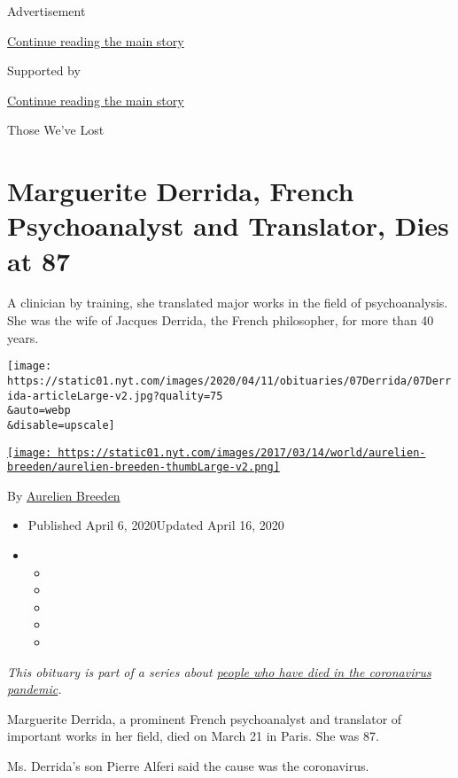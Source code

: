 Advertisement

\protect\hyperlink{after-top}{Continue reading the main story}

Supported by

\protect\hyperlink{after-sponsor}{Continue reading the main story}

Those We've Lost

\hypertarget{marguerite-derrida-french-psychoanalyst-and-translator-dies-at-87}{%
\section{Marguerite Derrida, French Psychoanalyst and Translator, Dies
at
87}\label{marguerite-derrida-french-psychoanalyst-and-translator-dies-at-87}}

A clinician by training, she translated major works in the field of
psychoanalysis. She was the wife of Jacques Derrida, the French
philosopher, for more than 40 years.

\texttt{[image: https://static01.nyt.com/images/2020/04/11/obituaries/07Derrida/07Derrida-articleLarge-v2.jpg?quality=75\\\&auto=webp\\\&disable=upscale]}

\href{https://www.nytimes.com/by/aurelien-breeden}{\texttt{[image: https://static01.nyt.com/images/2017/03/14/world/aurelien-breeden/aurelien-breeden-thumbLarge-v2.png]}}

By \href{https://www.nytimes.com/by/aurelien-breeden}{Aurelien Breeden}

\begin{itemize}
\item
  Published April 6, 2020Updated April 16, 2020
\item
  \begin{itemize}
  \item
  \item
  \item
  \item
  \item
  \end{itemize}
\end{itemize}

\emph{This obituary is part of a series about}
\href{https://www.nytimes.com/series/people-who-have-died-of-the-coronavirus}{\emph{people
who have died in the coronavirus pandemic}}\emph{.}

Marguerite Derrida, a prominent French psychoanalyst and translator of
important works in her field, died on March 21 in Paris. She was 87.

Ms. Derrida's son Pierre Alferi said the cause was the coronavirus.

